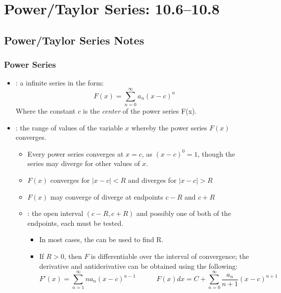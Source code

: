 \chapter{Power/Taylor Series: 10.6--10.8}

\section{Power/Taylor Series Notes}

\subsection{Power Series}
\begin{itemize}
  \item {}: a infinite series in the form:
    \[%
    F(x) = \sum_{n=0}^{\infty} a_n (x - c)^n
    \]%
    Where the constant \(c\) is the \textit{center} of the power series F(x).

  \item {}: the range of values of the variable \(x\)
    whereby the power series \(F(x)\) converges.
    \begin{itemize}
      \item Every power series converges at \(x = c\), as \((x-c)^0 = 1\),
        though the series may diverge for other values of \(x\).

      \item \(F(x)\) converges for \(\left| x - c \right| < R \) and diverges
        for \(\left| x - c \right| > R \)

      \item \(F(x)\) may converge of diverge at endpoints \(c-R\) and \(c+R\)

      \item {}: the open interval \((c-R, c+R)\) and
        possibly one of both of the endpoints, each must be tested.
        \begin{itemize}
          \item In most cases, the  can be used to find R.

          \item If \(R > 0\), then \(F\) is differentiable over the interval of
            convergence; the derivative and antiderivative can be obtained
            using the following:
            \[%
            F'(x) = \sum_{n=1}^{\infty} na_n(x-c)^{n-1} \qquad \quad
            F(x)dx = C + \sum_{n=0}^{\infty} \frac{a_n}{n+1}(x-c)^{n+1}
            \]%
        \end{itemize}


\end{itemize}
\end{itemize}
